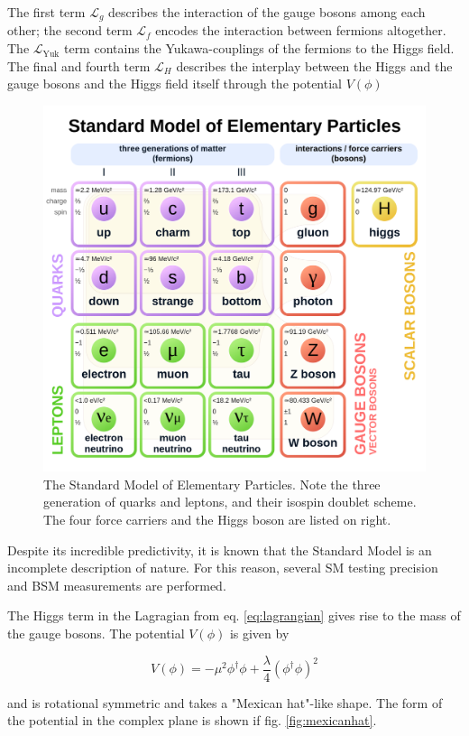 The first term $\mathcal{L}_g$ describes the interaction of the gauge bosons among each other; the second term $\mathcal{L}_f$ encodes the interaction between fermions altogether. The $\mathcal{L}_\text{Yuk}$ term contains the Yukawa-couplings of the fermions to the Higgs field. The final and fourth term $\mathcal{L}_H$ describes the interplay between the Higgs and the gauge bosons and the Higgs field itself through the potential $V(\phi)$

\begin{figure}[h!]
	\centering
	\includegraphics[width=0.6\linewidth]{figures/theory/sm.png}
	\caption{The Standard Model of Elementary Particles. Note the three generation of quarks and leptons, and their isospin doublet scheme. The four force carriers and the Higgs boson are listed on right. \cite{enwiki:1101993746}}
	\label{fig:sm}
\end{figure}

Despite its incredible predictivity, it is known that the Standard Model is an incomplete description of nature. For this reason, several SM testing precision and BSM measurements are performed.

The Higgs term in the Lagragian from eq. \ref{eq:lagrangian} gives rise to the mass of the gauge bosons. The potential $V(\phi)$ is given by

\begin{equation*}
	V(\phi) = -\mu^2 \phi^\dagger \phi + \frac{\lambda}{4}\left(\phi^\dagger\phi\right)^2 
\end{equation*}

and is rotational symmetric and takes a "Mexican hat"-like shape. The form of the potential in the complex plane is shown if fig. \ref{fig:mexicanhat}.

